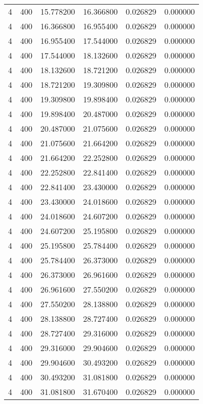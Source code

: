 \begin{longtable}{rrrrrr}
4 & 400 & 15.778200 & 16.366800 & 0.026829 & 0.000000 \\
4 & 400 & 16.366800 & 16.955400 & 0.026829 & 0.000000 \\
4 & 400 & 16.955400 & 17.544000 & 0.026829 & 0.000000 \\
4 & 400 & 17.544000 & 18.132600 & 0.026829 & 0.000000 \\
4 & 400 & 18.132600 & 18.721200 & 0.026829 & 0.000000 \\
4 & 400 & 18.721200 & 19.309800 & 0.026829 & 0.000000 \\
4 & 400 & 19.309800 & 19.898400 & 0.026829 & 0.000000 \\
4 & 400 & 19.898400 & 20.487000 & 0.026829 & 0.000000 \\
4 & 400 & 20.487000 & 21.075600 & 0.026829 & 0.000000 \\
4 & 400 & 21.075600 & 21.664200 & 0.026829 & 0.000000 \\
4 & 400 & 21.664200 & 22.252800 & 0.026829 & 0.000000 \\
4 & 400 & 22.252800 & 22.841400 & 0.026829 & 0.000000 \\
4 & 400 & 22.841400 & 23.430000 & 0.026829 & 0.000000 \\
4 & 400 & 23.430000 & 24.018600 & 0.026829 & 0.000000 \\
4 & 400 & 24.018600 & 24.607200 & 0.026829 & 0.000000 \\
4 & 400 & 24.607200 & 25.195800 & 0.026829 & 0.000000 \\
4 & 400 & 25.195800 & 25.784400 & 0.026829 & 0.000000 \\
4 & 400 & 25.784400 & 26.373000 & 0.026829 & 0.000000 \\
4 & 400 & 26.373000 & 26.961600 & 0.026829 & 0.000000 \\
4 & 400 & 26.961600 & 27.550200 & 0.026829 & 0.000000 \\
4 & 400 & 27.550200 & 28.138800 & 0.026829 & 0.000000 \\
4 & 400 & 28.138800 & 28.727400 & 0.026829 & 0.000000 \\
4 & 400 & 28.727400 & 29.316000 & 0.026829 & 0.000000 \\
4 & 400 & 29.316000 & 29.904600 & 0.026829 & 0.000000 \\
4 & 400 & 29.904600 & 30.493200 & 0.026829 & 0.000000 \\
4 & 400 & 30.493200 & 31.081800 & 0.026829 & 0.000000 \\
4 & 400 & 31.081800 & 31.670400 & 0.026829 & 0.000000 \\

\end{longtable}
